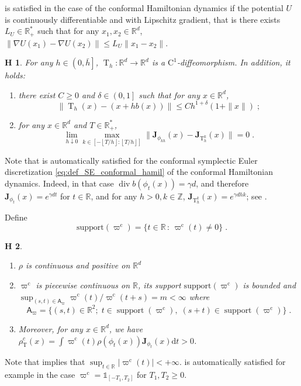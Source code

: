 \documentclass{article}
\newtheorem{assumption}{\textbf{H}\hspace{-3pt}}
\def\transfo{\operatorname{T}}
\def\rmd{\operatorname{d}\hspace{-2pt}}
\def\rset{\mathbb{R}}
\def\rmd{\mathrm{d}}
\def\eqsp{\,}
\def\msa{\mathsf{A}}
\def\eqsp{\;}
\newcommand{\ocint}[1]{\left(#1\right]}
\newcommand{\ccint}[1]{\left[#1\right]}
\newcommand{\1}{\mathds{1}}
\def\proposal{\rho}
\def\Jac{\mathbf{J}}
\newcommand{\JacOp}[1]{\Jac_{#1}}
\def\msa{\mathsf{A}}
\def\rset{\mathbb{R}}
\def\rsets{\mathbb{R}^*}
\def\zset{\mathbb{Z}}
\def\rmd{\mathrm{d}}
\def\rhoT{\rho_{\transfo}}
\def\varpic{\varpi^{\mathrm{c}}}
\newcommand{\partint}[1]{ \left \lfloor #1 \right \rfloor}
\def\divergence{\operatorname{div}}
\def\support{\mathrm{support}}
\begin{document}
 is satisfied in the case of the conformal Hamiltonian dynamics if the potential $U$ is continuously differentiable and with Lipschitz gradient, that is there exists $L_U\in\rsets_+$ such that for any $x_1, x_2\in\rset^d$, $\|\nabla U(x_1) - \nabla U(x_2)\|\leq L_U \|x_1 -x_2\|$.

  \begin{assumption}
   \label{assum:discretization_scheme}
For any $h \in\ocint{0,\bar{h}}$, $\transfo_h : \rset^d \to \rset^d$ is a  $\mathrm{C}^1$-diffeomorphism. In addition, it holds:
   \begin{enumerate}[label= (\roman*),wide]
       \item  \label{assum:discretization_scheme_i} there exist $C \geq 0$ and $\delta \in \ocint{0,1}$ such that for any $x\in\rset^d$,  $$\|\transfo_h(x) -(x+hb(x))\|\leq C h^{1+\delta} (1+\|x\|)\eqsp;$$
  \item \label{assum:jacobian_discretization} for any $x\in\rset^d$ and  $T\in\rsets_+$, $$ \lim_{h \downarrow 0} \max_{k\in[-\partint{T/h}: \partint{T/h}]}\|\JacOp{\phi_{kh}}(x)-\JacOp{\transfo_{h}^{k}}(x)\| = 0 \eqsp.$$
   \end{enumerate}
 \end{assumption}
 Note that  is automatically satisfied for the conformal symplectic Euler discretization \eqref{eq:def_SE_conformal_hamil} of the conformal Hamiltonian dynamics.  Indeed, in that case $\divergence b(\phi_t(x)) = \gamma d$, and therefore $\JacOp{\phi_t}(x) = e^{\gamma d t}$ for $t \in \rset$, and for any $h>0, k\in\zset$, $\JacOp{\transfo_h^k}(x) = e^{\gamma d hk}$; see \cite{francca2019conformal}.  
 
 Define
 \begin{equation}
   \label{eq:def_support}
\support(\varpic) =    \{t \in \rset \, :\, \varpic(t) \neq 0\}\eqsp.
 \end{equation}
\begin{assumption}
  \label{assum:continuitu_varpi}
   \begin{enumerate}[label= (\roman*),wide]
       \item
$\proposal$ is continuous and positive on $\rset^d$
\item \label{assum:vapri_ratio}    $\varpic$ is piecewise continuous on $\rset$, its support $\support(\varpic)$ is bounded and $\sup_{(s,t)\in \msa_\varpi} \varpic(t)/\varpic(t+s)= m <\infty$ where 
  $$\msa_\varpi = \{(s,t)\in\rset^2;\eqsp t\in\operatorname{support}(\varpic), \eqsp(s+t)\in\operatorname{support}(\varpic)\}\eqsp.$$
\item Moreover, for any $x\in\rset^d$, we have $\rhoT^c(x) = \int\varpic(t)\proposal(\phi_t(x))\JacOp{\phi_t}(x)\rmd t >0$.
\end{enumerate}
\end{assumption}
Note that  implies that
$\sup_{t\in\rset}|\varpic(t)|<+\infty$.  
is automatically satisfied for example in the case
$\varpic = \1_{\ccint{-T_1,T_2}}$ for $T_1,T_2 \geq 0$.
\end{document}
